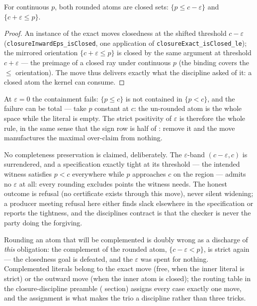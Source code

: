 \begin{bprop}\label{prop:cie-closed}
For continuous $p$, both rounded atoms are closed sets:
$\{p \le c - \varepsilon\}$ and $\{c + \varepsilon \le p\}$.
\end{bprop}
\begin{proof}
An instance of the exact move\textquotesingle s closedness at the
shifted threshold $c - \varepsilon$
(\texttt{closureInwardEps\_isClosed}, one application of
\texttt{closureExact\_isClosed\_le}); the mirrored orientation
$\{c + \varepsilon \le p\}$ is closed by the same argument at
threshold $c + \varepsilon$ --- the preimage of a closed ray under
continuous $p$ (the binding covers the $\le$ orientation). The move thus delivers exactly
what the discipline asked of it: a closed atom the kernel can
consume.
\end{proof}

\begin{bremark}
At $\varepsilon = 0$ the containment fails: $\{p \le c\}$ is not
contained in $\{p < c\}$, and the failure can be total --- take $p$
constant at $c$: the un-rounded atom is the whole space while the
literal is empty. The strict positivity of $\varepsilon$ is therefore
the whole rule, in the same sense that the sign row is half of
: remove it and the move manufactures the
maximal over-claim from nothing.
\end{bremark}

\begin{bremark}
No completeness preservation is claimed, deliberately. The
$\varepsilon$-band $(c - \varepsilon, c)$ is surrendered, and a
specification exactly tight at its threshold --- the intended witness
satisfies $p < c$ everywhere while $p$ approaches $c$ on the region
--- admits no $\varepsilon$ at all: every rounding excludes points the
witness needs. The honest outcome is refusal (no certificate exists
through this move), never silent widening; a producer meeting refusal
here either finds slack elsewhere in the specification or reports the
tightness, and the discipline\textquotesingle s contract is that the
checker is never the party doing the forgiving.
\end{bremark}

\begin{bremark}
Rounding an atom that will be complemented is doubly wrong as a
discharge of \emph{this} obligation: the complement of the rounded
atom, $\{c - \varepsilon < p\}$, is strict again --- the closedness
goal is defeated, and the $\varepsilon$ was spent for nothing.
Complemented literals belong to the exact move (free, when the inner
literal is strict) or the outward move (when the inner atom is
closed); the routing table in the closure-discipline preamble
( section) assigns every case
exactly one move, and the assignment is what makes the trio a
discipline rather than three tricks.
\end{bremark}

